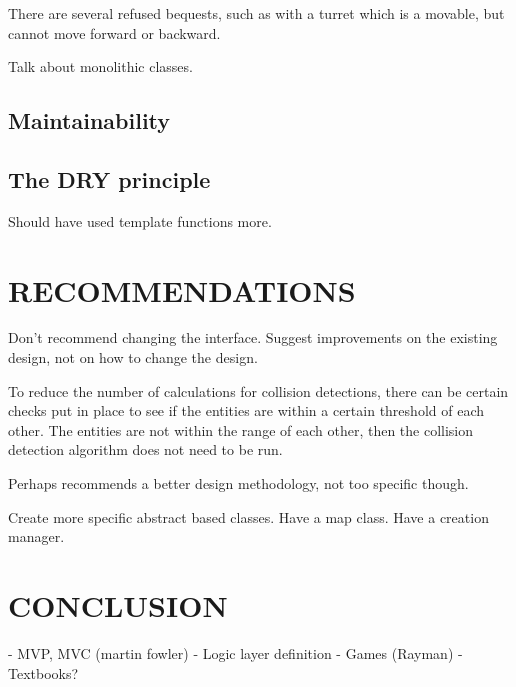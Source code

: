 \documentclass[10pt,twocolumn]{witseiepaper}
\begin{document}
There are several refused bequests, such as with a turret which is a movable, but cannot move forward or backward.

Talk about monolithic classes.

\subsection{Maintainability}

\subsection{The DRY principle}
Should have used template functions more.

%
\section{RECOMMENDATIONS} %
Don't recommend changing the interface. Suggest improvements on the existing design, not on how to change the design.

To reduce the number of calculations for collision detections, there can be certain checks put in place to see if the entities are within a certain threshold of each other. The entities are not within the range of each other, then the collision detection algorithm does not need to be run.

Perhaps recommends a better design methodology, not too specific though.

Create more specific abstract based classes.
Have a map class.
Have a creation manager.




%
\section{CONCLUSION}


\balance

%



- MVP, MVC (martin fowler)
- Logic layer definition
- Games (Rayman)
- Textbooks?
\end{document}
